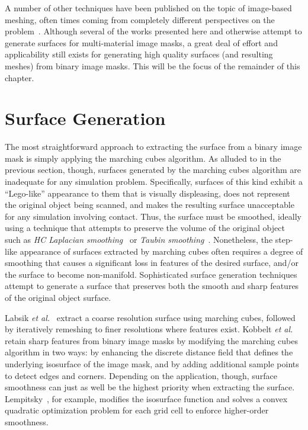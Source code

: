 A number of other techniques have been published on the topic of image-based meshing, often times coming from completely different perspectives on the problem~\cite{bronson_2014,fang_2009,boissonnat_2009,zhao_2016}. Although several of the works presented here and otherwise attempt to generate surfaces for multi-material image masks, a great deal of effort and applicability still exists for generating high quality surfaces (and resulting meshes) from binary image masks. This will be the focus of the remainder of this chapter.

\section{Surface Generation}
\label{Surface Generation}

The most straightforward approach to extracting the surface from a binary image mask is simply applying the marching cubes algorithm. As alluded to in the previous section, though, surfaces generated by the marching cubes algorithm are inadequate for any simulation problem. Specifically, surfaces of this kind exhibit a ``Lego-like'' appearance to them that is visually displeasing, does not represent the original object being scanned, and makes the resulting surface unacceptable for any simulation involving contact. Thus, the surface must be smoothed, ideally using a technique that attempts to preserve the volume of the original object such as \textit{HC Laplacian smoothing}~\cite{vollmer_1999} or \textit{Taubin smoothing}~\cite{taubin_1995}. Nonetheless, the step-like appearance of surfaces extracted by marching cubes often requires a degree of smoothing that causes a significant loss in features of the desired surface, and/or the surface to become non-manifold. Sophisticated surface generation techniques attempt to generate a surface that preserves both the smooth and sharp features of the original object surface.

Labsik \textit{et al.}~\cite{labsik_2002} extract a coarse resolution surface using marching cubes, followed by iteratively remeshing to finer resolutions where features exist. Kobbelt \textit{et al.}~\cite{kobbelt_2001} retain sharp features from binary image masks by modifying the marching cubes algorithm in two ways: by enhancing the discrete distance field that defines the underlying isosurface of the image mask, and by adding additional sample points to detect edges and corners. Depending on the application, though, surface smoothness can just as well be the highest priority when extracting the surface. Lempitsky~\cite{lempitsky_2010}, for example, modifies the isosurface function and solves a convex quadratic optimization problem for each grid cell to enforce higher-order smoothness.

